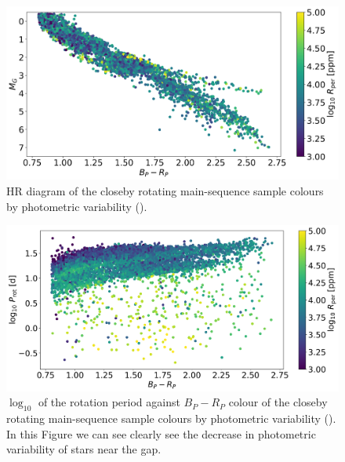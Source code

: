 \begin{figure}
\centering
    \includegraphics[width=\textwidth]{Figures/rot_gap_figures/HR.png}
    \caption{
    HR diagram of the closeby rotating main-sequence sample colours by photometric variability (\rper{}).}
    \label{fig:hr}
\end{figure}

\begin{figure}
\centering
    \includegraphics[width=\textwidth]{Figures/rot_gap_figures/rotational_dist.png}
    \caption{
    $\log_10$ of the rotation period against \gaia $B_P-R_P$ colour of the closeby rotating main-sequence sample colours by photometric variability (\rper{}). In this Figure we can see clearly see the decrease in photometric variability of stars near the gap.}
    \label{fig:prawn}
\end{figure}

